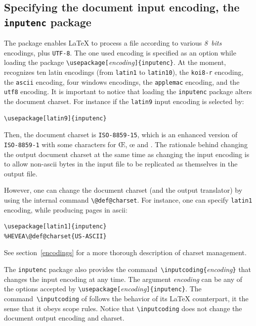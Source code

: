 \subsection{Specifying \label{inputenc}the document input encoding, the \texttt{inputenc} package}
%
The 
package enables \LaTeX{} to process a file
according to various \emph{8~bits} encodings, plus \texttt{UTF-8}.
The one used encoding is specified as an option while loading the package
\verb+\usepackage[+\textit{encoding}\verb+]{inputenc}+.
At the moment, \hevea{} recognizes ten latin encodings
(from \texttt{latin1} to \texttt{latin10}),
the \texttt{koi8-r} encoding,
the \texttt{ascii} encoding,
four windows encodings, the \texttt{applemac} encoding, and the
\texttt{utf8} encoding.
It is important to notice that loading the \verb+inputenc+ package
alters the \html{} document charset.
For instance if the \texttt{latin9} input encoding is selected by:
\begin{verbatim}
\usepackage[latin9]{inputenc}
\end{verbatim}
Then, the document charset is \verb+ISO-8859-15+, which is an
enhanced version of \verb+ISO-8859-1+ with some characters
for \OE, \oe{} and \texteuro.
The rationale behind changing the output document charset at the same
time as changing the input encoding is to allow
non-ascii bytes in the input file to be replicated as
themselves in the output file.

However, one can change the document charset (and the output
translator) by using the internal command \verb+\@def@charset+.
For instance, one can specify \texttt{latin1} encoding, while
producing \html{} pages in ascii:
\begin{verbatim}
\usepackage[latin1]{inputenc}
%HEVEA\@def@charset{US-ASCII}
\end{verbatim}
See section~\ref{encodings} for a more thorough description of \html{}
charset management.

The \texttt{inputenc} package also provides the
command~\verb+\inputcoding{+\textit{encoding}\verb+}+ that
changes the input encoding at any time.
The argument \textit{encoding} can be any of the options accepted
by \verb+\usepackage[+\textit{encoding}\verb+]{inputenc}+.
The command~\verb+\inputcoding+ of \hevea{}
follows the behavior of its \LaTeX{} counterpart, it the sense
that it obeys scope rules.
Notice that \verb+\inputcoding+ does not change the document output
encoding and charset.


